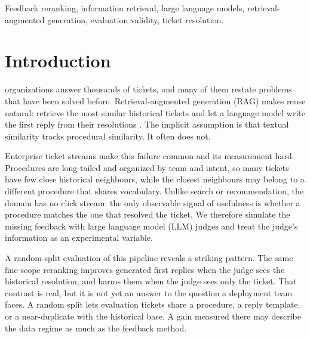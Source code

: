 \documentclass{ieeeaccess}
\begin{document}
\begin{keywords}
Feedback reranking, information retrieval, large language models,
retrieval-augmented generation, evaluation validity, ticket resolution.
\end{keywords}

\titlepgskip=-21pt

\maketitle


\section{Introduction}
\label{sec:introduction}
 organizations answer thousands of tickets, and many of them
restate problems that have been solved before. Retrieval-augmented generation
(RAG) makes reuse natural: retrieve the most similar historical tickets and let a
language model write the first reply from their resolutions
\cite{b1,b31}. The implicit assumption is that textual similarity tracks
procedural similarity. It often does not.

Enterprise ticket streams make this failure common and its measurement hard.
Procedures are long-tailed and organized by team and intent, so many tickets have
few close historical neighbours, while the closest neighbours may belong to a
different procedure that shares vocabulary. Unlike search or recommendation, the
domain has no click stream: the only observable signal of usefulness is whether a
procedure matches the one that resolved the ticket. We therefore simulate the
missing feedback with large language model (LLM) judges and treat the judge's
information as an experimental variable.

A random-split evaluation of this pipeline reveals a striking pattern. The same
fine-scope reranking improves generated first replies when the judge sees the
historical resolution, and harms them when the judge sees only the ticket. That contrast is real, but it is not yet an answer to the question a
deployment team faces. A random split lets evaluation tickets share a
procedure, a reply template, or a near-duplicate with the historical base. A gain
measured there may describe the data regime as much as the feedback method.
\end{document}
